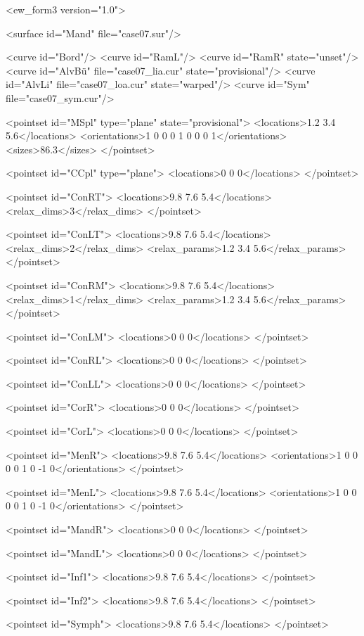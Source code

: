 
\begin{DoxyVerbInclude}
<ew_form3 version="1.0">

<surface id="Mand" file="case07.sur"/>

<curve id="Bord"/>
<curve id="RamL"/>
<curve id="RamR" state="unset"/>
<curve id="AlvBü" file="case07_lia.cur" state="provisional"/>
<curve id="AlvLi" file="case07_loa.cur" state="warped"/>
<curve id="Sym" file="case07_sym.cur"/>

<pointset id="MSpl" type="plane" state="provisional">
<locations>1.2 3.4 5.6</locations>
<orientations>1 0 0 0 1 0 0 0 1</orientations>
<sizes>86.3</sizes>
</pointset>

<pointset id="CCpl" type="plane">
<locations>0 0 0</locations>
</pointset>

<pointset id="ConRT">
<locations>9.8 7.6 5.4</locations>
<relax_dims>3</relax_dims>
</pointset>

<pointset id="ConLT">
<locations>9.8 7.6 5.4</locations>
<relax_dims>2</relax_dims>
<relax_params>1.2 3.4 5.6</relax_params>
</pointset>

<pointset id="ConRM">
<locations>9.8 7.6 5.4</locations>
<relax_dims>1</relax_dims>
<relax_params>1.2 3.4 5.6</relax_params>
</pointset>

<pointset id="ConLM">
<locations>0 0 0</locations>
</pointset>

<pointset id="ConRL">
<locations>0 0 0</locations>
</pointset>

<pointset id="ConLL">
<locations>0 0 0</locations>
</pointset>

<pointset id="CorR">
<locations>0 0 0</locations>
</pointset>

<pointset id="CorL">
<locations>0 0 0</locations>
</pointset>

<pointset id="MenR">
<locations>9.8 7.6 5.4</locations>
<orientations>1 0 0 0 0 1 0 -1 0</orientations>
</pointset>

<pointset id="MenL">
<locations>9.8 7.6 5.4</locations>
<orientations>1 0 0 0 0 1 0 -1 0</orientations>
</pointset>

<pointset id="MandR">
<locations>0 0 0</locations>
</pointset>

<pointset id="MandL">
<locations>0 0 0</locations>
</pointset>

<pointset id="Inf1">
<locations>9.8 7.6 5.4</locations>
</pointset>

<pointset id="Inf2">
<locations>9.8 7.6 5.4</locations>
</pointset>

<pointset id="Symph">
<locations>9.8 7.6 5.4</locations>
</pointset>


\end{DoxyVerbInclude}
